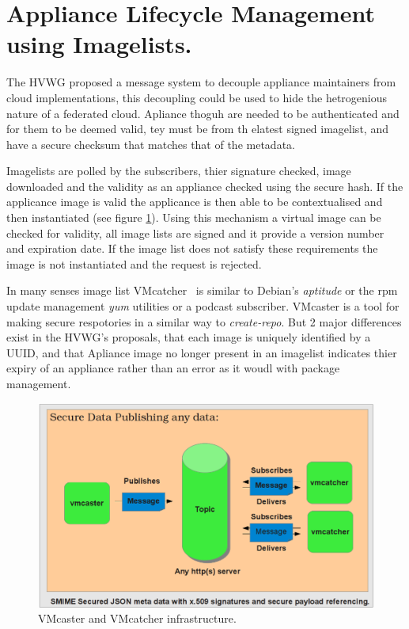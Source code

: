 \documentclass{llncs_Ibergrid2013}
\begin{document}
\section{Appliance Lifecycle Management using Imagelists.}
\label{sect-appliancelifecycle}

The HVWG proposed a message system to decouple appliance maintainers from cloud implementations, this decoupling could be used to hide the hetrogenious nature of a federated cloud. Apliance thoguh are needed to be authenticated and for them to be deemed valid, tey must be from th elatest signed imagelist, and have a secure checksum that matches that of the metadata.

Imagelists are polled by the subscribers, thier signature checked, image downloaded and the validity as an appliance checked using the secure hash. If the applicance image is valid the applicance is then able to be contextualised and then instantiated (see figure \ref{fig:infrastructure}). 
Using this mechanism a virtual image can be checked for validity, all image lists are signed and it provide a version number and expiration date. If the image list does not satisfy these requirements the image is not instantiated and the request is rejected.

In many senses image list VMcatcher~\cite{vmcatcher} is similar to Debian's \textit{aptitude} or the rpm update management \textit{yum} utilities or a podcast subscriber. VMcaster is a tool for making secure respotories in a similar way to \textit{create-repo}. But 2 major differences exist in the HVWG's proposals, that each image is uniquely identified by a UUID, and that Apliance image no longer present in an imagelist indicates thier expiry of an appliance rather than an error as it woudl with package management.

\begin{figure}[h]
\centering
\includegraphics[width=1\textwidth]{vmcaster_vmcatcher.png}
\caption{VMcaster and VMcatcher infrastructure.}
\label{fig:infrastructure}
\end{figure}
\end{document}
